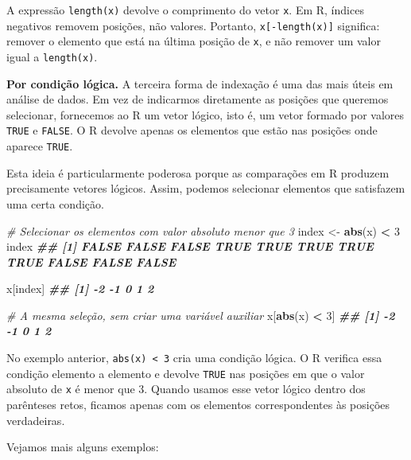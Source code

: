 \documentclass[
  portuguese,
  11pt,
  openany]{book}
\newenvironment{Shaded}{\begin{snugshade}}{\end{snugshade}}
\newcommand{\CommentTok}[1]{\textcolor[rgb]{0.56,0.35,0.01}{\textit{#1}}}
\newcommand{\DecValTok}[1]{\textcolor[rgb]{0.00,0.00,0.81}{#1}}
\newcommand{\DocumentationTok}[1]{\textcolor[rgb]{0.56,0.35,0.01}{\textbf{\textit{#1}}}}
\newcommand{\FunctionTok}[1]{\textcolor[rgb]{0.13,0.29,0.53}{\textbf{#1}}}
\newcommand{\NormalTok}[1]{#1}
\newcommand{\OtherTok}[1]{\textcolor[rgb]{0.56,0.35,0.01}{#1}}
\newcommand{\SpecialCharTok}[1]{\textcolor[rgb]{0.81,0.36,0.00}{\textbf{#1}}}
\begin{document}
A expressão \texttt{length(x)} devolve o comprimento do vetor \texttt{x}. Em R, índices negativos removem posições, não valores. Portanto, \texttt{x{[}-length(x){]}} significa: remover o elemento que está na última posição de \texttt{x}, e não remover um valor igual a \texttt{length(x)}.

\textbf{Por condição lógica.} A terceira forma de indexação é uma das mais úteis em análise de dados. Em vez de indicarmos diretamente as posições que queremos selecionar, fornecemos ao R um vetor lógico, isto é, um vetor formado por valores \texttt{TRUE} e \texttt{FALSE}. O R devolve apenas os elementos que estão nas posições onde aparece \texttt{TRUE}.

Esta ideia é particularmente poderosa porque as comparações em R produzem precisamente vetores lógicos. Assim, podemos selecionar elementos que satisfazem uma certa condição.

\begin{Shaded}
\begin{Highlighting}[]
\CommentTok{\# Selecionar os elementos com valor absoluto menor que 3}
\NormalTok{index }\OtherTok{\textless{}{-}} \FunctionTok{abs}\NormalTok{(x) }\SpecialCharTok{\textless{}} \DecValTok{3}
\NormalTok{index}
\DocumentationTok{\#\#  [1] FALSE FALSE FALSE  TRUE  TRUE  TRUE  TRUE  TRUE FALSE FALSE FALSE}

\NormalTok{x[index]}
\DocumentationTok{\#\# [1] {-}2 {-}1  0  1  2}

\CommentTok{\# A mesma seleção, sem criar uma variável auxiliar}
\NormalTok{x[}\FunctionTok{abs}\NormalTok{(x) }\SpecialCharTok{\textless{}} \DecValTok{3}\NormalTok{]}
\DocumentationTok{\#\# [1] {-}2 {-}1  0  1  2}
\end{Highlighting}
\end{Shaded}

No exemplo anterior, \texttt{abs(x)\ \textless{}\ 3} cria uma condição lógica. O R verifica essa condição elemento a elemento e devolve \texttt{TRUE} nas posições em que o valor absoluto de \texttt{x} é menor que 3. Quando usamos esse vetor lógico dentro dos parênteses retos, ficamos apenas com os elementos correspondentes às posições verdadeiras.

Vejamos mais alguns exemplos:
\end{document}
